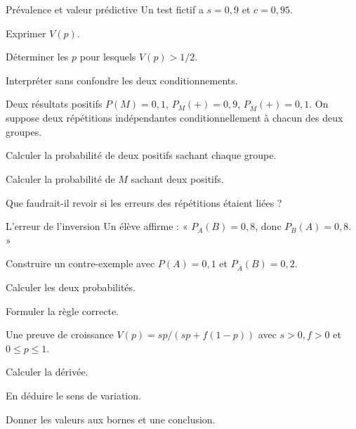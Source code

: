\clearpage
{}
\begingroup\renewcommand{\otBesoinPlace}[1]{}\begin{minipage}{\linewidth}
\begin{exercice}[3]{Prévalence et valeur prédictive}
Un test fictif a $s=0{,}9$ et $c=0{,}95$.
\begin{questions}
\item Exprimer $V(p)$.
\item Déterminer les $p$ pour lesquels $V(p)>1/2$.
\item Interpréter sans confondre les deux conditionnements.
\end{questions}
\end{exercice}
\begin{exercice}[3]{Deux résultats positifs}
$P(M)=0{,}1$, $P_M(+)=0{,}9$, $P_{\bar M}(+)=0{,}1$. On suppose deux répétitions indépendantes conditionnellement à chacun des deux groupes.
\begin{questions}
\item Calculer la probabilité de deux positifs sachant chaque groupe.
\item Calculer la probabilité de $M$ sachant deux positifs.
\item Que faudrait-il revoir si les erreurs des répétitions étaient liées ?
\end{questions}
\end{exercice}
\begin{exercice}[3]{L’erreur de l’inversion}
Un élève affirme : « $P_A(B)=0{,}8$, donc $P_B(A)=0{,}8$. »
\begin{questions}
\item Construire un contre-exemple avec $P(A)=0{,}1$ et $P_{\bar A}(B)=0{,}2$.
\item Calculer les deux probabilités.
\item Formuler la règle correcte.
\end{questions}
\end{exercice}
\begin{exercice}[3]{Une preuve de croissance}
$V(p)=sp/(sp+f(1-p))$ avec $s>0,f>0$ et $0\leq p\leq1$.
\begin{questions}
\item Calculer la dérivée.
\item En déduire le sens de variation.
\item Donner les valeurs aux bornes et une conclusion.
\end{questions}
\end{exercice}
\end{minipage}\endgroup
